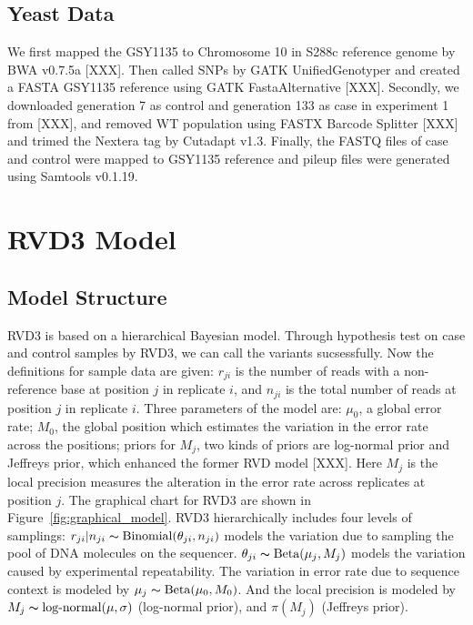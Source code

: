 \documentclass[11pt,reqno]{amsart}
\begin{document}
\subsection{Yeast Data}
We first mapped the GSY1135 to Chromosome 10 in S288c reference genome by BWA v0.7.5a [XXX]. Then called SNPs by GATK UnifiedGenotyper and created a FASTA GSY1135 reference using GATK FastaAlternative [XXX].
Secondly, we downloaded generation 7 as control and generation 133 as case in experiment 1 from [XXX], and removed WT population using FASTX Barcode Splitter [XXX] and trimed the Nextera tag by Cutadapt v1.3.
Finally, the FASTQ files of case and control were mapped to GSY1135 reference and pileup files were generated using Samtools v0.1.19.

\section{RVD3 Model}

\subsection{Model Structure}\label{sec:model_structure}
RVD3 is based on a hierarchical Bayesian model. Through hypothesis test on case and control samples by RVD3, we can call the variants sucsessfully. Now the definitions for sample data are given: $r_{ji}$ is the number of reads with a non-reference base at position $j$ in replicate $i$, and $n_{ji}$ is the total number of reads at position $j$ in replicate $i$. Three parameters of the model are: $\mu_0$, a global error rate; $M_0$, the global position which estimates the variation in the error rate across the positions; priors for $M_j$, two kinds of priors are log-normal prior and Jeffreys prior, which enhanced the former RVD model [XXX]. Here $M_j$ is the local precision measures the alteration in the error rate across replicates at position $j$. The graphical chart for RVD3 are shown in Figure~\ref{fig:graphical_model}.
RVD3 hierarchically includes four levels of samplings: $r_{ji} | n_{ji} \thicksim \text{Binomial}(\theta_{ji}, n_{ji})$ models the variation due to sampling the pool of DNA molecules on the sequencer. $\theta_{ji} \thicksim \text{Beta}(\mu_j, M_j)$ models the variation caused by experimental repeatability. The variation in error rate due to sequence context is modeled by $\mu_j \thicksim \text{Beta}(\mu_0, M_0)$. And the local precision is modeled by $ M_{j} \thicksim \text{log-normal}(\mu, \sigma)$ (log-normal prior), and $\pi\left({M}_{j}\right)$ (Jeffreys prior).
\end{document}
